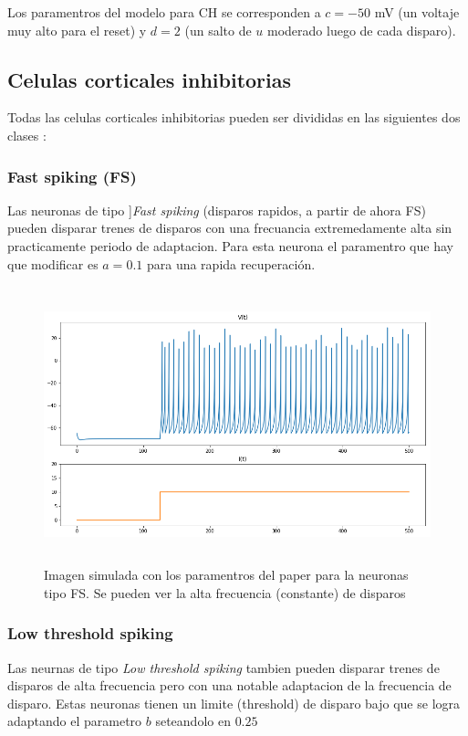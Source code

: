 \documentclass[12pt]{article}
\begin{document}
Los paramentros del modelo para CH se corresponden a $c = -50$ mV (un voltaje muy alto para el reset) y $d = 2$ (un salto de $u$ moderado luego de cada disparo).

\subsection{Celulas corticales inhibitorias}
Todas las celulas corticales inhibitorias pueden ser divididas en las siguientes dos clases \cite{inhibitorias}:

\subsubsection{Fast spiking (FS)}
Las neuronas de tipo ]\textit{Fast spiking} (disparos rapidos, a partir de ahora FS) pueden disparar trenes de disparos con una frecuancia extremedamente alta sin practicamente periodo de adaptacion.
Para esta neurona el paramentro que hay que modificar es $a = 0.1$ para una rapida recuperación.


\begin{figure}[h!]
    \centering
        \includegraphics[height=8cm]{images/FS.png}
    \caption[fontsize=2pt]{Imagen simulada con los paramentros del paper para la neuronas tipo FS. Se pueden ver la alta frecuencia (constante) de disparos}
\end{figure}

\subsubsection{Low threshold spiking}
Las neurnas de tipo \textit{Low threshold spiking} tambien pueden disparar trenes de disparos de alta frecuencia pero con una notable adaptacion de la frecuencia de disparo. Estas neuronas tienen un limite (threshold)
de disparo bajo que se logra adaptando el parametro $b$ seteandolo en $0.25$
\end{document}
